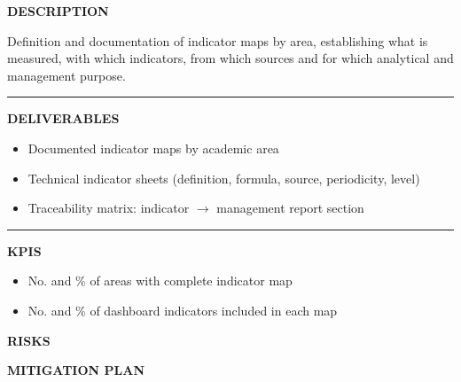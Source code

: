 \documentclass[11pt,a4paper]{scrreprt}
\newcommand{\fieldlabel}[1]{%
  {\footnotesize\sffamily\bfseries\color{mutedcolor}\MakeUppercase{#1}}\par\nopagebreak[4]
}
\newcommand{\fieldsep}{\vspace{3pt}\noindent\textcolor{bordercolor}{\rule{\linewidth}{0.4pt}}\vspace{3pt}\par}
\begin{document}
\begin{tcolorbox}[pabox={dashcolor}{A.P.2.1 \enspace\textbullet\enspace Definition and Development of Indicator Maps by Academic Areas}]

\fieldlabel{Description}
{\small Definition and documentation of indicator maps by area, establishing what is measured, with which indicators, from which sources and for which analytical and management purpose.}\par
\fieldsep
\fieldlabel{Deliverables}
{\small \begin{itemize}[noitemsep,topsep=2pt]
\item Documented indicator maps by academic area
\item Technical indicator sheets (definition, formula, source, periodicity, level)
\item Traceability matrix: indicator $\rightarrow$ management report section
\end{itemize}}\par
\fieldsep
\fieldlabel{KPIs}
{\small \begin{itemize}[noitemsep,topsep=2pt]
\item No. and \% of areas with complete indicator map
\item No. and \% of dashboard indicators included in each map
\end{itemize}}\par
\end{tcolorbox}
\begin{tcolorbox}[riskbox]
{\footnotesize\sffamily\bfseries\color{red!50!black} RISKS}\par{}
\end{tcolorbox}
\begin{tcolorbox}[mitbox]
{\footnotesize\sffamily\bfseries\color{green!40!black} MITIGATION PLAN}\par{}
\end{tcolorbox}
\vspace{8pt}
\end{document}
